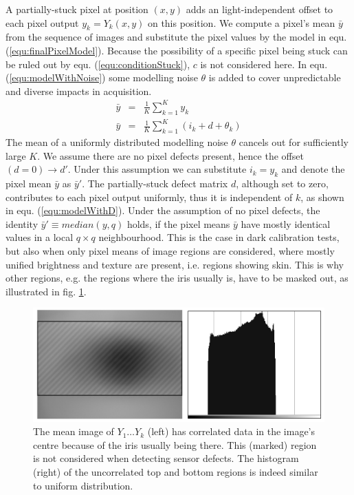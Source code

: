 \documentclass[10pt,twocolumn,letterpaper]{article}
\begin{document}
A partially-stuck pixel at position $(x,y)$ adds an light-independent offset to each pixel output $y_k = Y_k({x,y})$ on this position. We compute a pixel's mean $\bar{y}$ from the sequence of images and substitute the pixel values by the model in equ. (\ref{equ:finalPixelModel}). Because the possibility of a specific pixel being stuck can be ruled out by equ. (\ref{equ:conditionStuck}), $c$ is not considered here. In equ. (\ref{equ:modelWithNoise}) some modelling noise $\theta$ is added to cover unpredictable and diverse impacts in acquisition.
\begin{eqnarray}
\bar{y} & = & \frac{1}{K}\sum\limits_{k=1}^{K}y_k \\
\bar{y} & = & \frac{1}{K}\sum\limits_{k=1}^{K}(i_k+d+\theta_k) \label{equ:modelWithNoise}
\end{eqnarray}
The mean of a uniformly distributed modelling noise $\theta$ cancels out for sufficiently large $K$. We assume there are no pixel defects present, hence the offset $(d=0) \rightarrow d'$. Under this assumption we can substitute $i_k = y_k$ and denote the pixel mean $\bar{y}$ as $\bar{y}'$. The partially-stuck defect matrix $d$, although set to zero, contributes to each pixel output uniformly, thus it is independent of $k$, as shown in equ. (\ref{equ:modelWithD}). Under the assumption of no pixel defects, the identity $\bar{y}' \equiv median(y,q)$ holds, if the pixel means $\bar{y}$ have mostly identical values in a local $q \times q$ neighbourhood. This is the case in dark calibration tests, but also when only pixel means of image regions are considered, where mostly unified brightness and texture are present, i.e. regions showing skin. This is why other regions, e.g. the regions where the iris usually is, have to be masked out, as illustrated in fig. \ref{fig:correlated}. 

\begin{figure}[h]
  \centering
  \includegraphics[width=\linewidth]{img/correlated.png}
  \caption{The mean image of $Y_1 \dots Y_k$ (left) has correlated data in the image's centre because of the iris usually being there. This (marked) region is not considered when detecting sensor defects. The histogram (right) of the uncorrelated top and bottom regions is indeed similar to uniform distribution.}
  \label{fig:correlated}
\end{figure}
\end{document}
